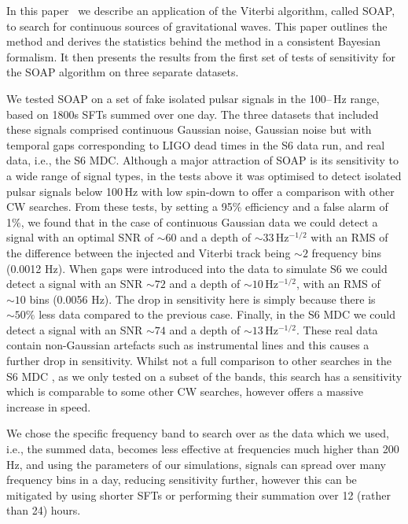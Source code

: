In this paper~ we describe an application of the Viterbi algorithm, called SOAP,
to search for continuous sources of gravitational waves.  This paper outlines
the method and derives the statistics behind the method in a consistent
Bayesian formalism. It then presents the results from the first set of tests of
sensitivity for the SOAP algorithm on three separate datasets.

%
%
We tested SOAP on a set of fake isolated pulsar signals in the
100\;--\,Hz range, based on 1800s \glspl{SFT} summed over one day.
The three datasets that included these signals comprised continuous Gaussian noise, Gaussian noise but with temporal gaps corresponding to LIGO dead times in the S6 data run, and real data, i.e., the
S6 \gls{MDC}. Although a major attraction of SOAP is its sensitivity to a wide
range of signal types, in the tests above it was optimised to detect isolated pulsar signals below 100\,Hz with low spin-down to offer a comparison with other \gls{CW} searches. From these tests, by setting a
95\% efficiency and a false alarm of 1\%, we found that in the case of  continuous Gaussian data we could detect a signal with an optimal \gls{SNR} of $\sim 60$ and a
depth of $\sim 33$\,Hz$^{-1/2}$ with an \gls{RMS} of the difference between the injected and Viterbi track being $\sim 2$ frequency bins (0.0012 Hz).
When gaps were introduced into the data to simulate S6 we could detect a signal with an
\gls{SNR} $\sim 72$  and a depth of $\sim 10$\,Hz$^{-1/2}$, with an \gls{RMS} of $\sim 10$ bins (0.0056 Hz). The drop in sensitivity here is simply because  there is $\sim 50 \%$ less data compared to the previous case. Finally, in the S6 \gls{MDC} we could
detect a signal with an \gls{SNR} $\sim 74$ and a depth of $\sim
13$\,Hz$^{-1/2}$.
These real data contain non-Gaussian artefacts such as instrumental lines and this causes a further drop in sensitivity.
Whilst not a full comparison to other searches in the S6 \gls{MDC} \citep{walsh2016ComparisonMethods}, as we only tested on a subset
of the bands, this search has a sensitivity which is comparable to some other \gls{CW} searches, however offers a massive increase in speed.

We chose the specific frequency band to search over as the data which we used, i.e., the summed data, becomes less effective at frequencies much higher than 200\,Hz, and using the parameters of our simulations, signals can spread over many frequency bins in a day, reducing sensitivity further, however this can be mitigated by using shorter \glspl{SFT} or performing their summation over 12 (rather than 24) hours.

